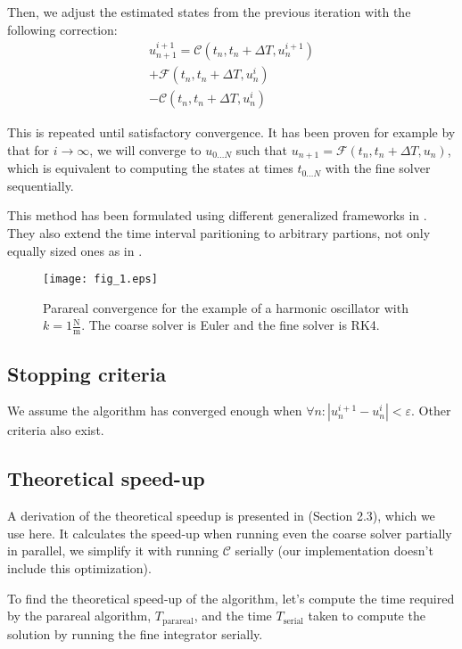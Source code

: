 \documentclass[conference]{IEEEtran}
\begin{document}
Then, we adjust the estimated states from the previous iteration with the following correction:
\begin{multline}
u^{i+1}_{n+1} = \mathcal{C}(t_n, t_n+\Delta T, u^{i+1}_n)\\ + \mathcal{F}(t_n, t_n+\Delta T, u^i_n)\\ - \mathcal{C}(t_n, t_n+\Delta T, u^{i}_n)
\end{multline}

This is repeated until satisfactory convergence. It has been proven for example by \cite{parareal2} that for $i \to \infty$, we will converge to $u_{0\dots N}$ such that $u_{n+1} = \mathcal{F}(t_n, t_n+\Delta T, u_n)$, which is equivalent to computing the states at times $t_{0\dots N}$ with the fine solver sequentially.

This method has been formulated using different generalized frameworks in \cite{parareal2}. They also extend the time interval paritioning to arbitrary partions, not only equally sized ones as in \cite{parareal}.

\begin{figure}[htbp]
\centerline{\texttt{[image: fig\_1.eps]}}
\caption{Parareal convergence for the example of a harmonic oscillator with $k = 1\frac{\text{N}}{\text{m}}$. The coarse solver is Euler and the fine solver is RK4.}
\label{oscillator}
\end{figure}

\subsection*{Stopping criteria}
We assume the algorithm has converged enough when $\forall n\colon |u^{i+1}_n - u^i_n| < \varepsilon$. Other criteria also exist. \cite{speedup}

\subsection*{Theoretical speed-up}

A derivation of the theoretical speedup is presented in \cite{speedup} (Section 2.3), which we use here. It calculates the speed-up when running even the coarse solver partially in parallel, we simplify it with running $\mathcal{C}$ serially (our implementation doesn't include this optimization). 

To find the theoretical speed-up of the algorithm, let's compute the time required by the parareal algorithm, $T_\text{parareal}$, and the time $T_\text{serial}$ taken to compute the solution by running the fine integrator serially. 
\end{document}
